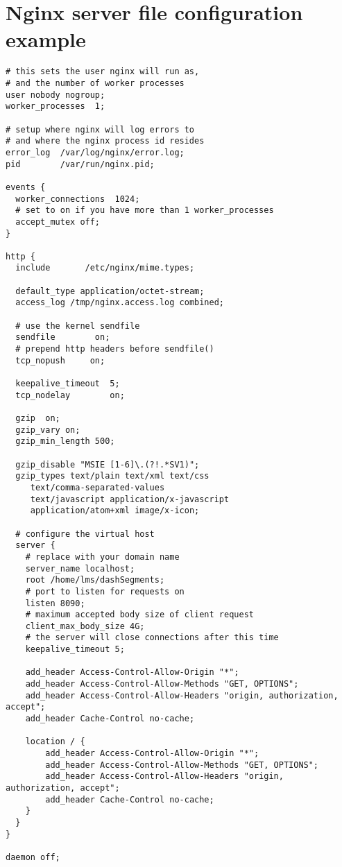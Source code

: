\section{Nginx server file configuration example}\label{ANX:nginxexample}

\begin{verbatim}
# this sets the user nginx will run as, 
# and the number of worker processes
user nobody nogroup;
worker_processes  1;

# setup where nginx will log errors to 
# and where the nginx process id resides
error_log  /var/log/nginx/error.log;
pid        /var/run/nginx.pid;

events {
  worker_connections  1024;
  # set to on if you have more than 1 worker_processes 
  accept_mutex off;
}

http {
  include       /etc/nginx/mime.types;

  default_type application/octet-stream;
  access_log /tmp/nginx.access.log combined;
 
  # use the kernel sendfile
  sendfile        on;
  # prepend http headers before sendfile() 
  tcp_nopush     on;

  keepalive_timeout  5;
  tcp_nodelay        on;

  gzip  on;
  gzip_vary on;
  gzip_min_length 500;
  
  gzip_disable "MSIE [1-6]\.(?!.*SV1)";
  gzip_types text/plain text/xml text/css
     text/comma-separated-values
     text/javascript application/x-javascript
     application/atom+xml image/x-icon;

  # configure the virtual host
  server {
    # replace with your domain name
    server_name localhost;
    root /home/lms/dashSegments;
    # port to listen for requests on
    listen 8090;
    # maximum accepted body size of client request 
    client_max_body_size 4G;
    # the server will close connections after this time 
    keepalive_timeout 5;
    
    add_header Access-Control-Allow-Origin "*";
    add_header Access-Control-Allow-Methods "GET, OPTIONS";
    add_header Access-Control-Allow-Headers "origin, authorization, accept";
    add_header Cache-Control no-cache;
    
    location / {
        add_header Access-Control-Allow-Origin "*";
        add_header Access-Control-Allow-Methods "GET, OPTIONS";
        add_header Access-Control-Allow-Headers "origin, authorization, accept";
        add_header Cache-Control no-cache;
    }
  }
}

daemon off;
\end{verbatim}

